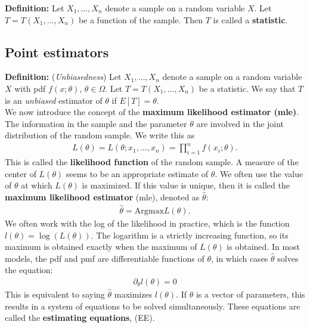 \documentclass{book}
\theoremstyle{definition}
\newcommand{\p}{\partial}
\begin{document}
\noindent\textbf{Definition:} Let $X_1, \dots, X_n$ denote a sample on a random variable $X$. Let $T = T(X_1,\dots,X_n)$ be a function of the sample. Then $T$ is called a \textbf{statistic}. 





\subsection{Point estimators}

\noindent \textbf{Definition:} (\textit{Unbiasedness}) Let $X_1,\dots,X_n$ denote a sample on a random variable $X$ with pdf $f(x;\theta)$, $\theta\in \Omega$. Let $T = T(X_1,\dots,X_n)$ be a statistic. We say that $T$ is an \textit{unbiased} estimator of $\theta$ if $E[T] = \theta$.  \\

We now introduce the concept of the \textbf{maximum likelihood estimator (mle)}. The information in the sample and the parameter $\theta$ are involved in the joint distribution of the random sample. We write this as
\begin{align}
\boxed{L(\theta) = L(\theta; x_1,\dots,x_n) = \prod^n_{i=1}f(x_i;\theta).}
\end{align}
This is called the \textbf{likelihood function} of the random sample. A measure of the center of $L(\theta)$ seems to be an appropriate estimate of $\theta$. We often use the value of $\theta$ at which $L(\theta)$ is maximized. If this value is unique, then it is called the \textbf{maximum likelihood estimator} (mle), denoted as $\hat{\theta}$:
\begin{align}
\hat{\theta} = \text{Argmax}L(\theta).
\end{align}
We often work with the log of the likelihood in practice, which is the function $l(\theta) = \log(L(\theta))$. The logarithm is a strictly increasing function, so its maximum is obtained exactly when the maximum of $L(\theta)$ is obtained. In most models, the pdf and pmf are differentiable functions of $\theta$, in which cases $\hat{\theta}$ solves the equation:
\begin{align}
\boxed{\p_\theta l(\theta) = 0 }
\end{align}
This is equivalent to saying $\hat{\theta}$ maximizes $l(\theta)$. If $\theta$ is a vector of parameters, this results in a system of equations to be solved simultaneously. These equations are called the \textbf{estimating equations}, (EE).
\end{document}
